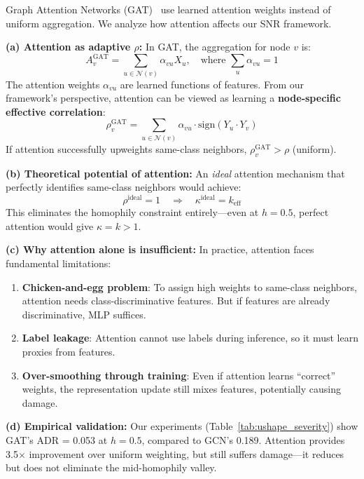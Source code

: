 \begin{remark}
\label{rem:attention_extension}
Graph Attention Networks (GAT)~\cite{velivckovic2018gat} use learned attention weights instead of uniform aggregation. We analyze how attention affects our SNR framework.

\textbf{(a) Attention as adaptive $\rho$:}
In GAT, the aggregation for node $v$ is:
\begin{equation}
    A_v^{\text{GAT}} = \sum_{u \in \mathcal{N}(v)} \alpha_{vu} X_u, \quad \text{where } \sum_u \alpha_{vu} = 1
\end{equation}
The attention weights $\alpha_{vu}$ are learned functions of features. From our framework's perspective, attention can be viewed as learning a \textbf{node-specific effective correlation}:
\begin{equation}
    \rho_v^{\text{GAT}} = \sum_{u \in \mathcal{N}(v)} \alpha_{vu} \cdot \text{sign}(Y_u \cdot Y_v)
\end{equation}
If attention successfully upweights same-class neighbors, $\rho_v^{\text{GAT}} > \rho$ (uniform).

\textbf{(b) Theoretical potential of attention:}
An \textit{ideal} attention mechanism that perfectly identifies same-class neighbors would achieve:
\begin{equation}
    \rho^{\text{ideal}} = 1 \quad \Rightarrow \quad \kappa^{\text{ideal}} = k_{\mathrm{eff}}
\end{equation}
This eliminates the homophily constraint entirely---even at $h = 0.5$, perfect attention would give $\kappa = k > 1$.

\textbf{(c) Why attention alone is insufficient:}
In practice, attention faces fundamental limitations:
\begin{enumerate}
    \item \textbf{Chicken-and-egg problem}: To assign high weights to same-class neighbors, attention needs class-discriminative features. But if features are already discriminative, MLP suffices.
    \item \textbf{Label leakage}: Attention cannot use labels during inference, so it must learn proxies from features.
    \item \textbf{Over-smoothing through training}: Even if attention learns ``correct'' weights, the representation update still mixes features, potentially causing damage.
\end{enumerate}

\textbf{(d) Empirical validation:}
Our experiments (Table~\ref{tab:ushape_severity}) show GAT's ADR = 0.053 at $h=0.5$, compared to GCN's 0.189. Attention provides 3.5$\times$ improvement over uniform weighting, but still suffers damage---it reduces but does not eliminate the mid-homophily valley.


\end{remark}
